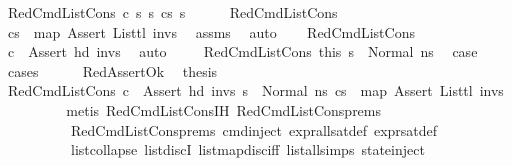 \begin{isabellebody}
\ {\isacharparenleft}{\kern0pt}RedCmdListCons\ c\ s\ s{\isacharprime}{\kern0pt}{\isacharprime}{\kern0pt}\ cs\ s{\isacharprime}{\kern0pt}{\isacharparenright}{\kern0pt}\ \ \isanewline
\ \ \isamarkupfalse%
\ RedCmdListCons\ \isamarkupfalse%
\ {\isachardoublequoteopen}cs\ {\isacharequal}{\kern0pt}\ map\ Assert\ {\isacharparenleft}{\kern0pt}List{\isachardot}{\kern0pt}tl\ invs{\isacharparenright}{\kern0pt}{\isachardoublequoteclose}\ \isamarkupfalse%
\ assms\ \isamarkupfalse%
\ auto\isanewline
\ \ \isamarkupfalse%
\ RedCmdListCons\ \isamarkupfalse%
\ {\isachardoublequoteopen}c\ {\isacharequal}{\kern0pt}\ Assert\ {\isacharparenleft}{\kern0pt}hd\ invs{\isacharparenright}{\kern0pt}{\isachardoublequoteclose}\ \isamarkupfalse%
\ auto\ \isanewline
\isanewline
\ \ \isamarkupfalse%
\ RedCmdListCons\ this\ {\isacartoucheopen}s\ {\isacharequal}{\kern0pt}\ Normal\ ns{}{\isacartoucheclose}\ \isamarkupfalse%
\ {\isacharquery}{\kern0pt}case\isanewline
\ \ \isamarkupfalse%
\ cases\isanewline
\ \ \ \ \isamarkupfalse%
\ RedAssertOk\ \isamarkupfalse%
\ {\isacharquery}{\kern0pt}thesis\ \isanewline
\ \ \ \ \ \ \isamarkupfalse%
\ RedCmdListCons\ {\isacartoucheopen}c\ {\isacharequal}{\kern0pt}\ Assert\ {\isacharparenleft}{\kern0pt}hd\ invs{\isacharparenright}{\kern0pt}{\isacartoucheclose}\ {\isacartoucheopen}s\ {\isacharequal}{\kern0pt}\ Normal\ ns{}{\isacartoucheclose}\ {\isacartoucheopen}cs\ {\isacharequal}{\kern0pt}\ map\ Assert\ {\isacharparenleft}{\kern0pt}List{\isachardot}{\kern0pt}tl\ invs{\isacharparenright}{\kern0pt}{\isacartoucheclose}\ \isanewline
\ \ \ \ \ \ \isamarkupfalse%
\ {\isacharparenleft}{\kern0pt}metis\ RedCmdListCons{\isachardot}{\kern0pt}IH\ RedCmdListCons{\isachardot}{\kern0pt}prems{\isacharparenleft}{\kern0pt}{}{\isacharparenright}{\kern0pt}\isanewline
\ \ \ \ \ \ \ \ \ \ RedCmdListCons{\isachardot}{\kern0pt}prems{\isacharparenleft}{\kern0pt}{}{\isacharparenright}{\kern0pt}\ cmd{\isachardot}{\kern0pt}inject{\isacharparenleft}{\kern0pt}{}{\isacharparenright}{\kern0pt}\ expr{\isacharunderscore}{\kern0pt}all{\isacharunderscore}{\kern0pt}sat{\isacharunderscore}{\kern0pt}def\ expr{\isacharunderscore}{\kern0pt}sat{\isacharunderscore}{\kern0pt}def\ \isanewline
\ \ \ \ \ \ \ \ \ \ list{\isachardot}{\kern0pt}collapse\ list{\isachardot}{\kern0pt}discI\ list{\isachardot}{\kern0pt}map{\isacharunderscore}{\kern0pt}disc{\isacharunderscore}{\kern0pt}iff\ list{\isacharunderscore}{\kern0pt}all{\isacharunderscore}{\kern0pt}simps{\isacharparenleft}{\kern0pt}{}{\isacharparenright}{\kern0pt}\ state{\isachardot}{\kern0pt}inject{\isacharparenright}{\kern0pt}\isanewline

\end{isabellebody}
